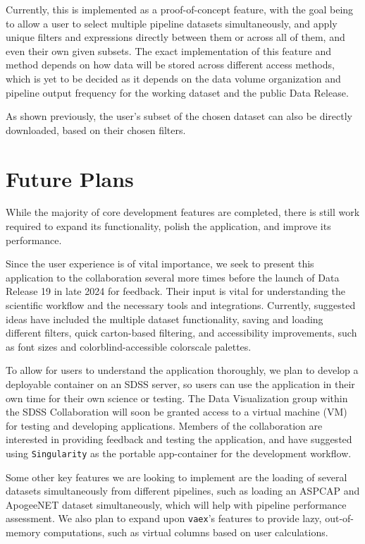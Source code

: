 \documentclass[a4paper,10pt,twocolumn]{article}
\begin{document}
Currently, this is implemented as a proof-of-concept feature, with the goal being to allow a user to select multiple pipeline datasets simultaneously, and apply unique filters and expressions directly between them or across all of them, and even their own given subsets.
The exact implementation of this feature and method depends on how data will be stored across different access methods, which is yet to be decided as it depends on the data volume organization and pipeline output frequency for the working dataset and the public Data Release.

As shown previously, the user's subset of the chosen dataset can also be directly downloaded, based on their chosen filters.

\section{Future Plans}
\label{sec:future}
While the majority of core development features are completed, there is still work required to expand its functionality, polish the application, and improve its performance.

Since the user experience is of vital importance, we seek to present this application to the collaboration several more times before the launch of Data Release 19 in late 2024 for feedback. Their input is vital for understanding the scientific workflow and the necessary tools and integrations. Currently, suggested ideas have included the multiple dataset functionality, saving and loading different filters, quick carton-based filtering, and accessibility improvements, such as font sizes and colorblind-accessible colorscale palettes.

To allow for users to understand the application thoroughly, we plan to develop a deployable container on an SDSS server, so users can use the application in their own time for their own science or testing. The Data Visualization group within the SDSS Collaboration will soon be granted access to a virtual machine (VM) for testing and developing applications. Members of the collaboration are interested in providing feedback and testing the application, and have suggested using \texttt{Singularity} \parencite{singularity} as the portable app-container for the development workflow.

Some other key features we are looking to implement are the loading of several datasets simultaneously from different pipelines, such as loading an ASPCAP and ApogeeNET dataset simultaneously, which will help with pipeline performance assessment. We also plan to expand upon \texttt{vaex}'s features to provide lazy, out-of-memory computations, such as virtual columns based on user calculations.
\end{document}
